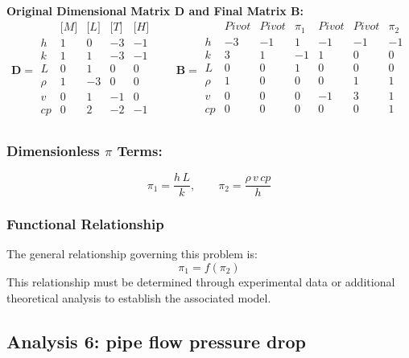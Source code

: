 \textbf{Original Dimensional Matrix $\mathbf{D}$ and Final Matrix $\mathbf{B}$:}
\begin{equation}\mathbf{D} = \begin{array}{r|rrrr}
& \text{[}M\text{]} & \text{[}L\text{]} & \text{[}T\text{]} & \text{[}H\text{]} \\
\hline
h & 1 & 0 & -3 & -1 \\
k & 1 & 1 & -3 & -1 \\
L & 0 & 1 & 0 & 0 \\
\rho & 1 & -3 & 0 & 0 \\
v & 0 & 1 & -1 & 0 \\
cp & 0 & 2 & -2 & -1 \\
\end{array}
\qquad
\mathbf{B} = \begin{array}{r|rrrrrr}
& Pivot & Pivot & \pi_{1} & Pivot & Pivot & \pi_{2} \\
\hline
h & -3 & -1 & 1 & -1 & -1 & -1 \\
k & 3 & 1 & -1 & 1 & 0 & 0 \\
L & 0 & 0 & 1 & 0 & 0 & 0 \\
\rho & 1 & 0 & 0 & 0 & 1 & 1 \\
v & 0 & 0 & 0 & -1 & 3 & 1 \\
cp & 0 & 0 & 0 & 0 & 0 & 1 \\
\end{array}\end{equation}

\subsubsection*{Dimensionless $\pi$ Terms:}
\begin{equation}
\pi_{1} = \frac{h \, L}{k}, \qquad
\pi_{2} = \frac{\rho \, v \, cp}{h}
\end{equation}

\subsubsection*{Functional Relationship}
The general relationship governing this problem is:
\begin{equation}
\pi_1 = f(\pi_2)
\end{equation}
This relationship must be determined through experimental data or additional theoretical analysis to establish the associated model.

\subsection{Analysis 6: pipe flow pressure drop}
\label{sec:Pipe_Flow_Pressure_Drop}

